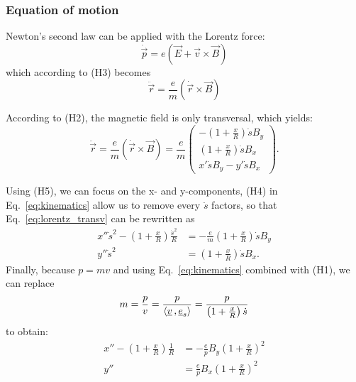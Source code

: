 \subsubsection{Equation of motion}
Newton's second law can be applied with the Lorentz force:
\begin{equation}
\dot{\vec{p}} = e(\vec{E}+\vec{v} \times \vec{B}) 
\end{equation}
which according to (H3) becomes
\begin{equation}
\ddot{\vec{r}} = \frac{e}{m}(\dot{\vec{r}} \times \vec{B})
\end{equation}

According to (H2), the magnetic field is only transversal, which yields:
\begin{equation}
\label{eq:lorentz_transv}
\ddot{\vec{r}} = \frac{e}{m}(\dot{\vec{r}} \times \vec{B})
= \frac{e}{m}
    \begin{pmatrix}
        -\left(1+\frac{x}{R}\right)\dot{s}B_y \\
        \left(1+\frac{x}{R}\right)\dot{s}B_x \\
        x'\dot{s}B_y - y'\dot{s}B_x
    \end{pmatrix}.
\end{equation}

Using (H5), we can focus on the x- and y-components, (H4) in Eq.~\eqref{eq:kinematics} allow us to remove every $\ddot{s}$ factors, so that Eq.~\eqref{eq:lorentz_transv} can be rewritten as
\begin{equation}
\begin{aligned}
x'' \dot{s}^2 - \left(1+\frac{x}{R}\right)\frac{\dot{s}^2}{R}
&= -\frac{e}{m} \left(1+\frac{x}{R}\right)\dot{s}B_y \\
y'' \dot{s}^2 &=    \left(1+\frac{x}{R}\right)\dot{s}B_x.
\end{aligned}
\end{equation}
Finally, because $p=mv$ and using Eq.~\eqref{eq:kinematics} combined with (H1), we can replace
\begin{equation}
m = \frac{p}{v} = \frac{p}{\langle \underline{v} {\,,\,} \underline{e}_s \rangle} = \frac{p}{\left(1+\frac{x}{R}\right)\dot{s}}
\end{equation}
to obtain:
\begin{equation}
\begin{aligned}
x''-\left(1+\frac{x}{R}\right)\frac{1}{R} &= -\frac{e}{p} B_y\left(1+\frac{x}{R}\right)^2 \\
y'' &= \frac{e}{p} B_x\left(1+\frac{x}{R}\right)^2
\end{aligned}
\end{equation}

